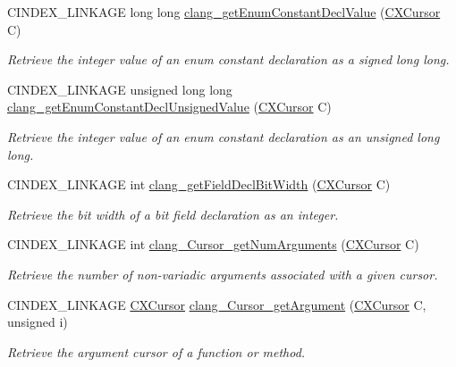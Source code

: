 \begin{DoxyCompactItemize}
C\+I\+N\+D\+E\+X\+\_\+\+L\+I\+N\+K\+A\+GE long long \mbox{\hyperlink{group__CINDEX__TYPES_ga6b8585818420e7512feb4c9d209b4f4d}{clang\+\_\+get\+Enum\+Constant\+Decl\+Value}} (\mbox{\hyperlink{structCXCursor}{C\+X\+Cursor}} C)
\begin{DoxyCompactList}\small\item\em Retrieve the integer value of an enum constant declaration as a signed long long. \end{DoxyCompactList}\item 
C\+I\+N\+D\+E\+X\+\_\+\+L\+I\+N\+K\+A\+GE unsigned long long \mbox{\hyperlink{group__CINDEX__TYPES_gaf7cbd4f2d371dd93e8bc997c951a1aef}{clang\+\_\+get\+Enum\+Constant\+Decl\+Unsigned\+Value}} (\mbox{\hyperlink{structCXCursor}{C\+X\+Cursor}} C)
\begin{DoxyCompactList}\small\item\em Retrieve the integer value of an enum constant declaration as an unsigned long long. \end{DoxyCompactList}\item 
C\+I\+N\+D\+E\+X\+\_\+\+L\+I\+N\+K\+A\+GE int \mbox{\hyperlink{group__CINDEX__TYPES_ga80bbb872dde5b2f26964081338108f91}{clang\+\_\+get\+Field\+Decl\+Bit\+Width}} (\mbox{\hyperlink{structCXCursor}{C\+X\+Cursor}} C)
\begin{DoxyCompactList}\small\item\em Retrieve the bit width of a bit field declaration as an integer. \end{DoxyCompactList}\item 
C\+I\+N\+D\+E\+X\+\_\+\+L\+I\+N\+K\+A\+GE int \mbox{\hyperlink{group__CINDEX__TYPES_ga5254f761b57fd78de3ac9c6bfcaa7fed}{clang\+\_\+\+Cursor\+\_\+get\+Num\+Arguments}} (\mbox{\hyperlink{structCXCursor}{C\+X\+Cursor}} C)
\begin{DoxyCompactList}\small\item\em Retrieve the number of non-\/variadic arguments associated with a given cursor. \end{DoxyCompactList}\item 
C\+I\+N\+D\+E\+X\+\_\+\+L\+I\+N\+K\+A\+GE \mbox{\hyperlink{structCXCursor}{C\+X\+Cursor}} \mbox{\hyperlink{group__CINDEX__TYPES_ga673c5529d33eedd0b78aca5ac6fc1d7c}{clang\+\_\+\+Cursor\+\_\+get\+Argument}} (\mbox{\hyperlink{structCXCursor}{C\+X\+Cursor}} C, unsigned i)
\begin{DoxyCompactList}\small\item\em Retrieve the argument cursor of a function or method. \end{DoxyCompactList}\item 

\end{DoxyCompactItemize}
